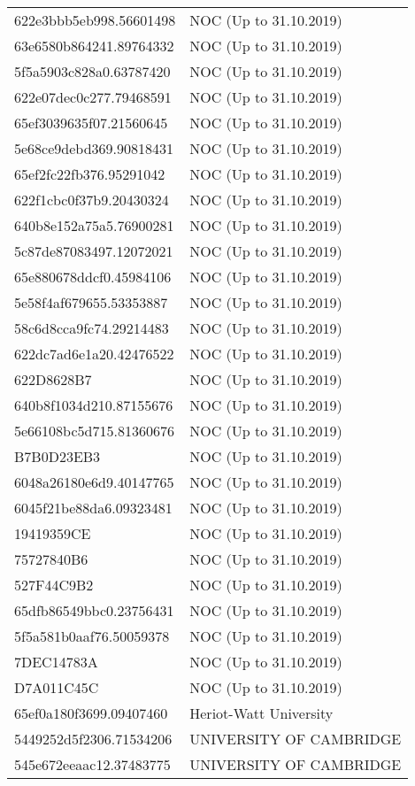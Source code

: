 \begin{tabular}{ll}
622e3bbb5eb998.56601498 & NOC (Up to 31.10.2019) \\
63e6580b864241.89764332 & NOC (Up to 31.10.2019) \\
5f5a5903c828a0.63787420 & NOC (Up to 31.10.2019) \\
622e07dec0c277.79468591 & NOC (Up to 31.10.2019) \\
65ef3039635f07.21560645 & NOC (Up to 31.10.2019) \\
5e68ce9debd369.90818431 & NOC (Up to 31.10.2019) \\
65ef2fc22fb376.95291042 & NOC (Up to 31.10.2019) \\
622f1cbc0f37b9.20430324 & NOC (Up to 31.10.2019) \\
640b8e152a75a5.76900281 & NOC (Up to 31.10.2019) \\
5c87de87083497.12072021 & NOC (Up to 31.10.2019) \\
65e880678ddcf0.45984106 & NOC (Up to 31.10.2019) \\
5e58f4af679655.53353887 & NOC (Up to 31.10.2019) \\
58c6d8cca9fc74.29214483 & NOC (Up to 31.10.2019) \\
622dc7ad6e1a20.42476522 & NOC (Up to 31.10.2019) \\
622D8628B7 & NOC (Up to 31.10.2019) \\
640b8f1034d210.87155676 & NOC (Up to 31.10.2019) \\
5e66108bc5d715.81360676 & NOC (Up to 31.10.2019) \\
B7B0D23EB3 & NOC (Up to 31.10.2019) \\
6048a26180e6d9.40147765 & NOC (Up to 31.10.2019) \\
6045f21be88da6.09323481 & NOC (Up to 31.10.2019) \\
19419359CE & NOC (Up to 31.10.2019) \\
75727840B6 & NOC (Up to 31.10.2019) \\
527F44C9B2 & NOC (Up to 31.10.2019) \\
65dfb86549bbc0.23756431 & NOC (Up to 31.10.2019) \\
5f5a581b0aaf76.50059378 & NOC (Up to 31.10.2019) \\
7DEC14783A & NOC (Up to 31.10.2019) \\
D7A011C45C & NOC (Up to 31.10.2019) \\
65ef0a180f3699.09407460 & Heriot-Watt University \\
5449252d5f2306.71534206 & UNIVERSITY OF CAMBRIDGE \\
545e672eeaac12.37483775 & UNIVERSITY OF CAMBRIDGE \\

\end{tabular}
